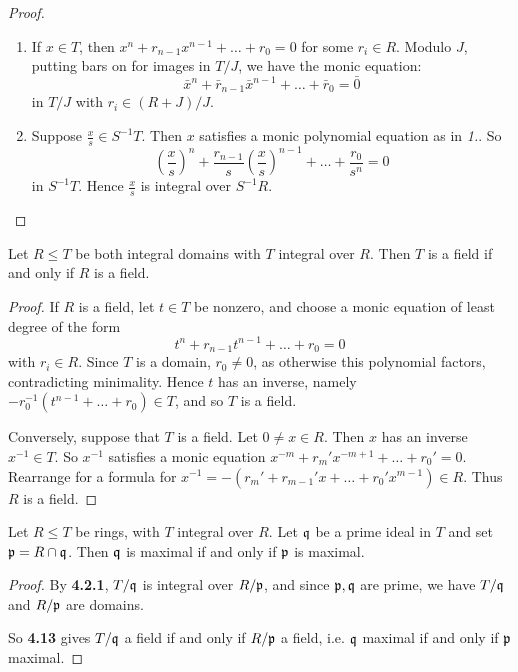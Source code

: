 \documentclass[10pt,a4paper]{article}
\begin{document}
\begin{proof}\hspace*{0cm}
  \begin{enumerate}
    \item If $x \in T$, then $x^n + r_{n-1}x^{n-1}+\ldots+r_0 = 0$ for some $r_i \in R$. Modulo $J$, putting bars on for images in $T/J$, we have the monic equation:
    \[\bar{x}^n + \bar{r}_{n-1}\bar{x}^{n-1}+\ldots+\bar{r}_0=\bar{0}\]
    in $T/J$ with $r_i \in (R+J)/J$.

    \item Suppose $\frac{x}{s} \in S^{-1}T$. Then $x$ satisfies a monic polynomial equation as in \textit{1.}. So
    \[\left(\frac{x}{s}\right)^n +\frac{r_{n-1}}{s}\left(\frac{x}{s}\right)^{n-1}+\ldots+\frac{r_0}{s^n} = 0\]
    in $S^{-1}T$. Hence $\frac{x}{s}$ is integral over $S^{-1}R$.
  \end{enumerate}
\end{proof}
\begin{lemma}
  Let $R \leq T$ be both integral domains with $T$ integral over $R$. Then $T$ is a field if and only if $R$ is a field.
\end{lemma}
\begin{proof}
  If $R$ is a field, let $t \in T$ be nonzero, and choose a monic equation of least degree of the form
  \[t^n + r_{n-1}t^{n-1} + \ldots + r_0 = 0\]
  with $r_i \in R$. Since $T$ is a domain, $r_0 \neq 0$, as otherwise this polynomial factors, contradicting minimality. Hence $t$ has an inverse, namely $-r_0^{-1}(t^{n-1}+\ldots+r_0)\in T$, and so $T$ is a field.

  Conversely, suppose that $T$ is a field. Let $0 \neq x \in R$. Then $x$ has an inverse $x^{-1} \in T$. So $x^{-1}$ satisfies a monic equation $x^{-m} + r_m'x^{-m+1} + \ldots +  r_0' = 0$. Rearrange for a formula for $x^{-1} = -(r_m' + r_{m-1}'x+\ldots+r_0'x^{m-1})\in R$. Thus $R$ is a field.
\end{proof}
\begin{lemma}
  Let $R \leq T$ be rings, with $T$ integral over $R$. Let $\mathfrak{q}$ be a prime ideal in $T$ and set $\mathfrak{p} = R \cap \mathfrak{q}$. Then $\mathfrak{q}$ is maximal if and only if $\mathfrak{p}$ is maximal.
\end{lemma}
\begin{proof}
  By \textbf{4.2.1}, $T/\mathfrak{q}$ is integral over $R/\mathfrak{p}$, and since $\mathfrak{p}, \mathfrak{q}$ are prime, we have $T/\mathfrak{q}$ and $R/\mathfrak{p}$ are domains.

  So \textbf{4.13} gives $T/\mathfrak{q}$ a field if and only if $R/\mathfrak{p}$ a field, i.e. $\mathfrak{q}$ maximal if and only if $\mathfrak{p}$ maximal.
\end{proof}
\end{document}
